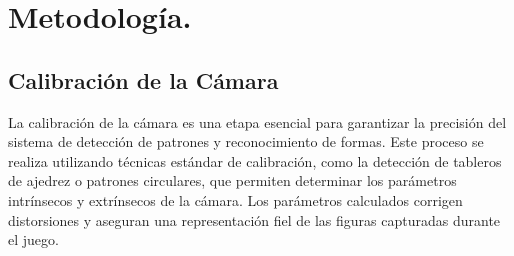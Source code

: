 \chapter{Metodología.}

\section{Calibración de la Cámara}
La calibración de la cámara es una etapa esencial para garantizar la precisión del sistema de detección de patrones y reconocimiento de formas. Este proceso se realiza utilizando técnicas estándar de calibración, como la detección de tableros de ajedrez o patrones circulares, que permiten determinar los parámetros intrínsecos y extrínsecos de la cámara. Los parámetros calculados corrigen distorsiones y aseguran una representación fiel de las figuras capturadas durante el juego.

